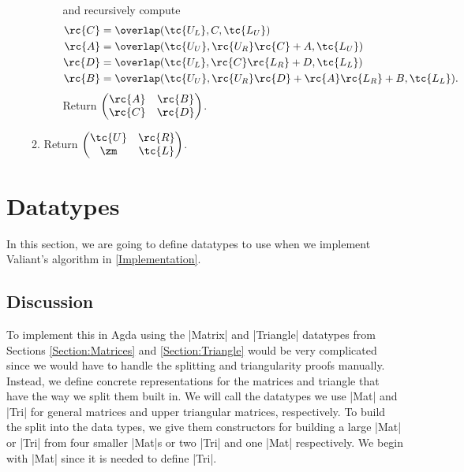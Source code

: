 \begin{itemize}
\begin{enumerate}
\begin{itemize}
          and recursively compute 
          \begin{align*}
            \rc{C} &= \overlap(\tc{U_L},C,\tc{L_U}) \\
            \rc{A} &= \overlap(\tc{U_U},\rc{U_R}\rc{C} + A,\tc{L_U}) \\
            \rc{D} &= \overlap(\tc{U_L},\rc{C}\rc{L_R} + D,\tc{L_L}) \\
            \rc{B} &= \overlap(\tc{U_U},\rc{U_R}\rc{D} + \rc{A}\rc{L_R} + B,\tc{L_L}).
          \end{align*}
         Return $
            \begin{pmatrix}
              \rc{A} & \rc{B} \\
              \rc{C} & \rc{D}
            \end{pmatrix}$.
    \end{itemize}
    \item Return $
        \begin{pmatrix}
          \tc{U} & \rc{R} \\
          \zm    & \tc{L}
        \end{pmatrix}$.
  \end{enumerate}
\end{itemize}
\section{Datatypes}
In this section, we are going to define datatypes to use when we implement Valiant's algorithm in \ref{Implementation}.
\subsection{Discussion}
To implement this in Agda using the |Matrix| and |Triangle| datatypes from Sections \ref{Section:Matrices} and \ref{Section:Triangle} would be very complicated since we would have to handle the splitting and triangularity proofs manually. Instead, we define concrete representations for the matrices and triangle that have the way we split them built in.
We will call the datatypes we use |Mat| and |Tri| for general matrices and upper triangular matrices, respectively.
To build the split into the data types, we give them constructors for building a large |Mat| or |Tri| from four smaller |Mat|s or two |Tri| and one |Mat| respectively. We begin with |Mat| since it is needed to define |Tri|. 

